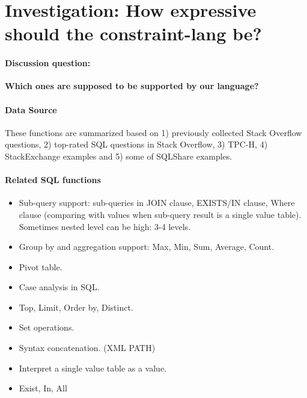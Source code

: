 \documentclass[letter, notitlepage]{article}
\begin{document}
\section{Investigation: How expressive should the constraint-lang be?}
\paragraph{Discussion question:} \textbf{Which ones are supposed to be supported by our language?} 


\paragraph{Data Source} These functions are summarized based on 1) previously collected Stack Overflow questions, 2) top-rated SQL questions in Stack Overflow, 3) TPC-H, 4) StackExchange examples and 5) some of SQLShare examples.

\paragraph{Related SQL functions}
\begin{itemize}\itemsep-1pt
\item Sub-query support: sub-queries in JOIN clause, EXISTS/IN clause, Where clause (comparing with values when sub-query result is a single value table). Sometimes nested level can be high: 3-4 levels.
\item Group by and aggregation support: Max, Min, Sum, Average, Count.
\item Pivot table.
\item Case analysis in SQL.
\item Top, Limit, Order by, Distinct.
\item Set operations.
\item Syntax concatenation. (XML PATH)
\item Interpret a single value table as a value.
\item Exist, In, All
\end{itemize}
\end{document}
